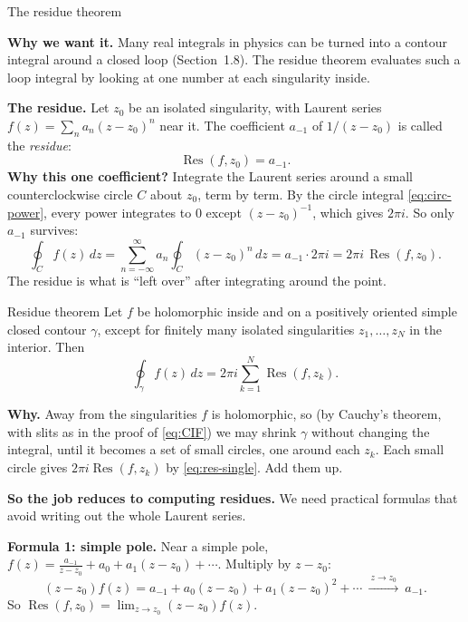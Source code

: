 \documentclass[11pt]{beamer}
\begin{document}
\begin{frame}[allowframebreaks=1.00]{The residue theorem}
\footnotesize

\textbf{Why we want it.} Many real integrals in physics can be turned into a contour integral
around a closed loop (Section~1.8). The residue theorem evaluates such a loop integral by looking
at one number at each singularity inside.

\textbf{The residue.} Let \(z_0\) be an isolated singularity, with Laurent series
\(f(z)=\sum_n a_n(z-z_0)^n\) near it. The coefficient \(a_{-1}\) of \(1/(z-z_0)\) is called the
\emph{residue}:
\[
 \operatorname{Res}(f,z_0)=a_{-1}.
\]
\textbf{Why this one coefficient?} Integrate the Laurent series around a small counterclockwise
circle \(C\) about \(z_0\), term by term. By the circle integral \eqref{eq:circ-power}, every power
integrates to \(0\) except \((z-z_0)^{-1}\), which gives \(2\pi i\). So only \(a_{-1}\) survives:
\begin{equation}
 \oint_C f(z)\,dz
 =\sum_{n=-\infty}^{\infty}a_n\oint_C(z-z_0)^n\,dz
 =a_{-1}\cdot2\pi i
 =2\pi i\,\operatorname{Res}(f,z_0).
 \label{eq:res-single}
\end{equation}
The residue is what is ``left over'' after integrating around the point.


\begin{block}{Residue theorem}
Let $f$ be holomorphic inside and on a positively oriented simple closed contour $\gamma$,
except for finitely many isolated singularities $z_1,\ldots,z_N$ in the interior.  Then
\begin{equation}
 \oint_\gamma f(z)\,dz
 =2\pi i\sum_{k=1}^{N}\operatorname{Res}(f,z_k).
 \label{eq:res-thm}
\end{equation}
\end{block}
\textbf{Why.} Away from the singularities \(f\) is holomorphic, so (by Cauchy's theorem, with slits
as in the proof of \eqref{eq:CIF}) we may shrink \(\gamma\) without changing the integral, until it
becomes a set of small circles, one around each \(z_k\). Each small circle gives
\(2\pi i\operatorname{Res}(f,z_k)\) by \eqref{eq:res-single}. Add them up.

\textbf{So the job reduces to computing residues.} We need practical formulas that avoid writing
out the whole Laurent series.


\textbf{Formula 1: simple pole.} Near a simple pole,
\(f(z)=\frac{a_{-1}}{z-z_0}+a_0+a_1(z-z_0)+\cdots\). Multiply by \(z-z_0\):
\[
 (z-z_0)f(z)=a_{-1}+a_0(z-z_0)+a_1(z-z_0)^2+\cdots\ \xrightarrow{\ z\to z_0\ }\ a_{-1}.
\]
So \(\operatorname{Res}(f,z_0)=\lim_{z\to z_0}(z-z_0)f(z)\).


\end{frame}
\end{document}
